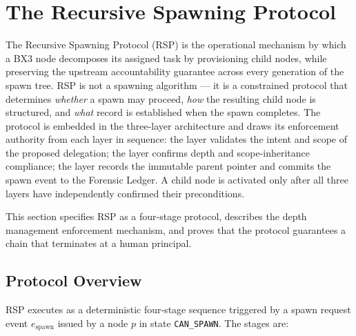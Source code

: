 \section{The Recursive Spawning Protocol}
\label{sec:recursive-spawning-protocol}

The Recursive Spawning Protocol (RSP) is the operational mechanism by which a BX3 node decomposes its assigned task by provisioning child nodes, while preserving the upstream accountability guarantee across every generation of the spawn tree. RSP is not a spawning algorithm — it is a constrained protocol that determines \textit{whether} a spawn may proceed, \textit{how} the resulting child node is structured, and \textit{what} record is established when the spawn completes. The protocol is embedded in the three-layer architecture and draws its enforcement authority from each layer in sequence: the \purpose{} layer validates the intent and scope of the proposed delegation; the \bounds{} layer confirms depth and scope-inheritance compliance; the \fact{} layer records the immutable parent pointer and commits the spawn event to the Forensic Ledger. A child node is activated only after all three layers have independently confirmed their preconditions.

This section specifies RSP as a four-stage protocol, describes the depth management enforcement mechanism, and proves that the protocol guarantees a chain that terminates at a human principal.

\subsection{Protocol Overview}
\label{sec:rsp-overview}

RSP executes as a deterministic four-stage sequence triggered by a spawn request event $e_{\text{spawn}}$ issued by a node $p$ in state \texttt{CAN\_SPAWN}. The stages are:

